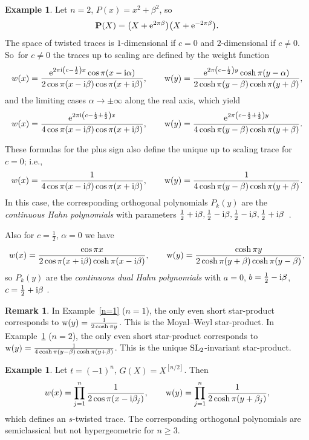 \documentclass[pdftex]{sigma}
\theoremstyle{definition}
\newtheorem{Example}[Theorem]{Example}
\newtheorem{Remark}[Theorem]{Remark}
\numberwithin{equation}{section}
\begin{document}
\begin{Example}\label{n=2} Let $n=2$, $P(x)=x^2+\beta^2$, so
\[
\mathbf{P}(X)=\big(X+{\rm e}^{2\pi \beta}\big)\big(X+{\rm e}^{-2\pi \beta}\big).
\]
The space of twisted traces is $1$-dimensional if $c=0$ and $2$-dimensional if $c\ne 0$. So~for $c\ne 0$ the traces up to scaling
are defined by the weight function
\[
w(x)=\frac{{\rm e}^{2\pi {\rm i}\left(c-\frac{1}{2}\right)x} \cos\pi (x-{\rm i}\alpha)}{2\cos \pi(x-{\rm i}\beta )\cos \pi(x+{\rm i}\beta )},\qquad {\rm w}(y)=\frac{{\rm e}^{2\pi\left(c-\frac{1}{2}\right)y} \cosh\pi (y-\alpha)}{2\cosh \pi(y-\beta)\cosh \pi(y+\beta)},
\]
and the limiting cases $\alpha\to \pm \infty$ along the real axis, which yield
\[
w(x)=\frac{{\rm e}^{2\pi {\rm i}\left(c-\frac{1}{2}\pm \frac{1}{2}\right)x}}{4\cos \pi(x-{\rm i}\beta )\cos \pi(x+{\rm i}\beta )},\qquad {\rm w}(y)=\frac{{\rm e}^{2\pi\left(c-\frac{1}{2}\pm \frac{1}{2}\right)y}}{4\cosh \pi(y-\beta)\cosh \pi(y+\beta)}.
\]

These formulas for the plus sign also define the unique up to scaling trace for $c=0$; i.e., \[
w(x)=\frac{1}{4\cos\pi(x-{\rm i}\beta )\cos\pi(x+{\rm i}\beta )},\qquad {\rm w}(y)=\frac{1}{4\cosh\pi(y-\beta)\cosh\pi(y+\beta)}.
\] In this case, the corresponding orthogonal polynomials $P_k(y)$ are the {\it continuous Hahn polynomials} with parameters $\tfrac{1}{2}+{\rm i}\beta ,\tfrac{1}{2}-{\rm i}\beta ,\tfrac{1}{2}-{\rm i}\beta ,\tfrac{1}{2}+{\rm i}\beta$~\cite[Section~1.4]{KS}.

Also for $c=\frac{1}{2}$, $\alpha=0$ we have
\[
w(x)=\frac{\cos \pi x}{2\cos\pi(x+{\rm i}\beta )\cosh\pi(x-{\rm i}\beta )},\qquad {\rm w}(y)=\frac{\cosh \pi y}{2\cosh\pi(y+\beta)\cosh\pi(y-\beta)},
\]
so $P_k(y)$ are the {\it continuous dual Hahn polynomials} with $a=0$, $b=\frac{1}{2}-{\rm i}\beta $, $c=\frac{1}{2}+{\rm i}\beta$ \cite[Section~1.3]{KS}.
\end{Example}

\begin{Remark} In Example~\ref{n=1} ($n=1$),
the only even short star-product corresponds
to ${\rm w}(y)=\frac{1}{2\cosh \pi y}$. This is the Moyal--Weyl star-product.
In Example~\ref{n=2} ($n=2$), the only even short star-product corresponds
to ${\rm w}(y)=\frac{1}{4\cosh \pi (y-\beta)\cosh \pi(y+\beta)}$. This is the
unique ${\rm SL}_2$-invariant star-product.
\end{Remark}

\begin{Example}\label{betai} Let $t=(-1)^n$, $G(X)=X^{[n/2]}$. Then
\[
w(x)=\prod_{j=1}^n\frac{1}{2\cos \pi(x-{\rm i}\beta _j)},\qquad
{\rm w}(y)=\prod_{j=1}^n\frac{1}{2\cosh \pi(y+\beta_j)},
\]
which defines an $s$-twisted trace.
The corresponding orthogonal polynomials are semiclassical but not hypergeometric for $n\ge 3$.
\end{Example}
\end{document}
